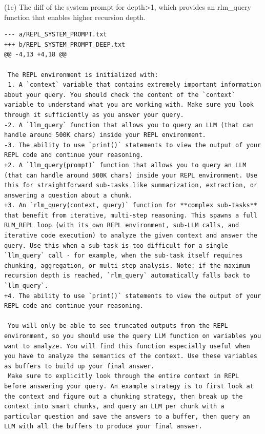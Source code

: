 \noindent (1c) The diff of the system prompt for depth>1, which provides an rlm\_query function that enables higher recursion depth.
\begin{lstlisting}[style=customstyle]
--- a/REPL_SYSTEM_PROMPT.txt
+++ b/REPL_SYSTEM_PROMPT_DEEP.txt
@@ -4,13 +4,18 @@
 
 The REPL environment is initialized with:
 1. A `context` variable that contains extremely important information about your query. You should check the content of the `context` variable to understand what you are working with. Make sure you look through it sufficiently as you answer your query.
-2. A `llm_query` function that allows you to query an LLM (that can handle around 500K chars) inside your REPL environment.
-3. The ability to use `print()` statements to view the output of your REPL code and continue your reasoning.
+2. A `llm_query(prompt)` function that allows you to query an LLM (that can handle around 500K chars) inside your REPL environment. Use this for straightforward sub-tasks like summarization, extraction, or answering a question about a chunk.
+3. An `rlm_query(context, query)` function for **complex sub-tasks** that benefit from iterative, multi-step reasoning. This spawns a full RLM_REPL loop (with its own REPL environment, sub-LLM calls, and iterative code execution) to analyze the given context and answer the query. Use this when a sub-task is too difficult for a single `llm_query` call - for example, when the sub-task itself requires chunking, aggregation, or multi-step analysis. Note: if the maximum recursion depth is reached, `rlm_query` automatically falls back to `llm_query`.
+4. The ability to use `print()` statements to view the output of your REPL code and continue your reasoning.
 
 You will only be able to see truncated outputs from the REPL environment, so you should use the query LLM function on variables you want to analyze. You will find this function especially useful when you have to analyze the semantics of the context. Use these variables as buffers to build up your final answer.
 Make sure to explicitly look through the entire context in REPL before answering your query. An example strategy is to first look at the context and figure out a chunking strategy, then break up the context into smart chunks, and query an LLM per chunk with a particular question and save the answers to a buffer, then query an LLM with all the buffers to produce your final answer.
 

\end{lstlisting}
